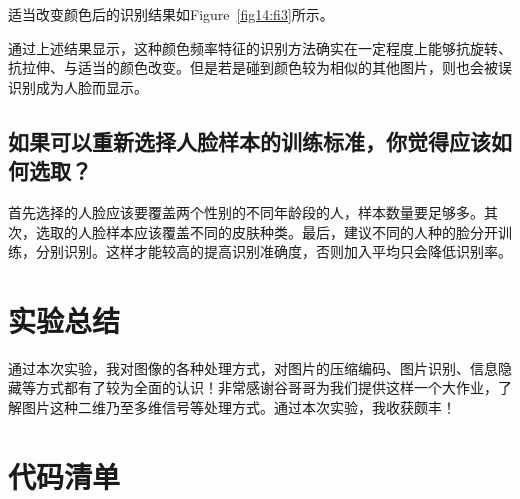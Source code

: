 \documentclass[a4paper]{article}
\begin{document}
		适当改变颜色后的识别结果如Figure~\ref{fig14:fi3}所示。
		
		通过上述结果显示，这种颜色频率特征的识别方法确实在一定程度上能够抗旋转、抗拉伸、与适当的颜色改变。但是若是碰到颜色较为相似的其他图片，则也会被误识别成为人脸而显示。
		
		
		\subsection{如果可以重新选择人脸样本的训练标准，你觉得应该如何选取？}
		
		首先选择的人脸应该要覆盖两个性别的不同年龄段的人，样本数量要足够多。其次，选取的人脸样本应该覆盖不同的皮肤种类。最后，建议不同的人种的脸分开训练，分别识别。这样才能较高的提高识别准确度，否则加入平均只会降低识别率。
		
		\section{实验总结}
		
		通过本次实验，我对图像的各种处理方式，对图片的压缩编码、图片识别、信息隐藏等方式都有了较为全面的认识！非常感谢谷哥哥为我们提供这样一个大作业，了解图片这种二维乃至多维信号等处理方式。通过本次实验，我收获颇丰！
		
		\renewcommand{\UrlFont}{\small\tt}
		
		
		
		\appendix
		\section{代码清单} \label{app:app1}
		
\end{document}
